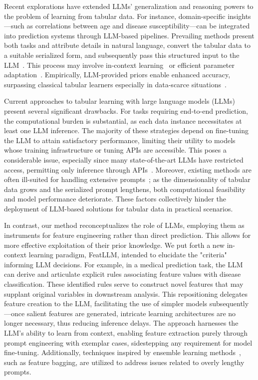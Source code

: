 Recent explorations have extended LLMs’ generalization and reasoning powers to the problem of learning from tabular data. For instance, domain-specific insights—such as correlations between age and disease susceptibility—can be integrated into prediction systems through LLM-based pipelines. Prevailing methods present both tasks and attribute details in natural language, convert the tabular data to a suitable serialized form, and subsequently pass this structured input to the LLM~\cite{dinh2022lift,wang2023anypredict}. This process may involve in-context learning~\cite{nam2023semi} or efficient parameter adaptation~\cite{dinh2022lift,hegselmann2023tabllm}. Empirically, LLM-provided priors enable enhanced accuracy, surpassing classical tabular learners especially in data-scarce situations~\cite{hegselmann2023tabllm}.

Current approaches to tabular learning with large language models (LLMs) present several significant drawbacks. For tasks requiring end-to-end prediction, the computational burden is substantial, as each data instance necessitates at least one LLM inference. The majority of these strategies depend on fine-tuning the LLM to attain satisfactory performance, limiting their utility to models whose training infrastructure or tuning APIs are accessible. This poses a considerable issue, especially since many state-of-the-art LLMs have restricted access, permitting only inference through APIs~\cite{anil2023palm,openai2023gpt4}. Moreover, existing methods are often ill-suited for handling extensive prompts~\cite{liu2023lost}; as the dimensionality of tabular data grows and the serialized prompt lengthens, both computational feasibility and model performance deteriorate. These factors collectively hinder the deployment of LLM-based solutions for tabular data in practical scenarios.

In contrast, our method reconceptualizes the role of LLMs, employing them as instruments for feature engineering rather than direct prediction. This allows for more effective exploitation of their prior knowledge. We put forth a new in-context learning paradigm, \textsf{FeatLLM}, intended to elucidate the "criteria" informing LLM decisions. For example, in a medical prediction task, the LLM can derive and articulate explicit rules associating feature values with disease classification. These identified rules serve to construct novel features that may supplant original variables in downstream analysis. This repositioning delegates feature creation to the LLM, facilitating the use of simpler models subsequently—once salient features are generated, intricate learning architectures are no longer necessary, thus reducing inference delays. The approach harnesses the LLM’s ability to learn from context, enabling feature extraction purely through prompt engineering with exemplar cases, sidestepping any requirement for model fine-tuning. Additionally, techniques inspired by ensemble learning methods~\cite{breiman2001random}, such as feature bagging, are utilized to address issues related to overly lengthy prompts.

